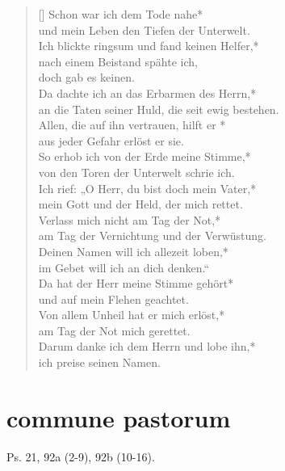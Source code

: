 \begin{verse}[\versewidth]
 Schon war ich dem Tode nahe*\\
und mein Leben den Tiefen der Unterwelt.\\
\vin Ich blickte ringsum und fand keinen Helfer,*\\
\vin nach einem Beistand spähte ich, \\ \vin doch gab es keinen.\\
Da dachte ich an das Erbarmen des Herrn,*\\
an die Taten seiner Huld, die seit ewig bestehen.\\
\vin Allen, die auf ihn vertrauen, hilft er *\\
\vin aus jeder Gefahr erlöst er sie.\\
So erhob ich von der Erde meine Stimme,*\\
von den Toren der Unterwelt schrie ich.\\
\vin Ich rief: „O Herr, du bist doch mein Vater,*\\
\vin mein Gott und der Held, der mich rettet.\\
Verlass mich nicht am Tag der Not,*\\
am Tag der Vernichtung und der Verwüstung.\\
\vin Deinen Namen will ich allezeit loben,* \\
\vin im Gebet will ich an dich denken.“\\
Da hat der Herr meine Stimme gehört*\\
und auf mein Flehen geachtet.\\
\vin Von allem Unheil hat er mich erlöst,*\\
\vin am Tag der Not mich gerettet.\\
Darum danke ich dem Herrn und lobe ihn,*\\
ich preise seinen Namen.\\

\end{verse}




\section{commune pastorum}

Ps. 21, 92a (2-9), 92b (10-16).\\


